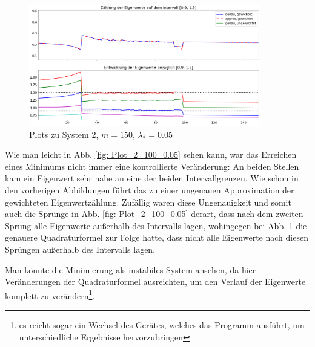 \documentclass[a4paper,12pt]{report}
\newcommand{\1}{\mathds{1}}
\theoremstyle{plain} %
\theoremstyle{definition} %
\theoremstyle{remark}
\begin{document}
            \begin{figure}[h!t]
                  \centering
                  \includegraphics[width=0.9\textwidth, keepaspectratio]{./Original/Plot_2_150_0.05.png}
                  \caption{Plots zu System 2, $m=150$, $\lambda_*=0.05$}
                  \label{fig: Plot_2_150_0.05}
            \end{figure}

            Wie man leicht in Abb. \ref{fig: Plot_2_100_0.05} sehen kann, war das Erreichen eines Minimums nicht immer eine kontrollierte Veränderung:
            An beiden Stellen kam ein Eigenwert sehr nahe an eine der beiden Intervallgrenzen. Wie schon in den vorherigen Abbildungen führt das zu einer ungenauen Approximation der gewichteten Eigenwertzählung.
            Zufällig waren diese Ungenauigkeit und somit auch die Sprünge in Abb. \ref{fig: Plot_2_100_0.05} derart, dass nach dem zweiten Sprung alle Eigenwerte außerhalb des Intervalls lagen,
            wohingegen bei Abb. \ref{fig: Plot_2_150_0.05} die genauere Quadraturformel zur Folge hatte, dass nicht alle Eigenwerte nach diesen Sprüngen außerhalb des Intervalls lagen.

            Man könnte die Minimierung als instabiles System ansehen, da hier Veränderungen der Quadraturformel ausreichten, um den Verlauf der Eigenwerte komplett zu verändern\footnote{es reicht sogar ein Wechsel des Gerätes, welches das Programm ausführt, um unterschiedliche Ergebnisse hervorzubringen}.
\end{document}

